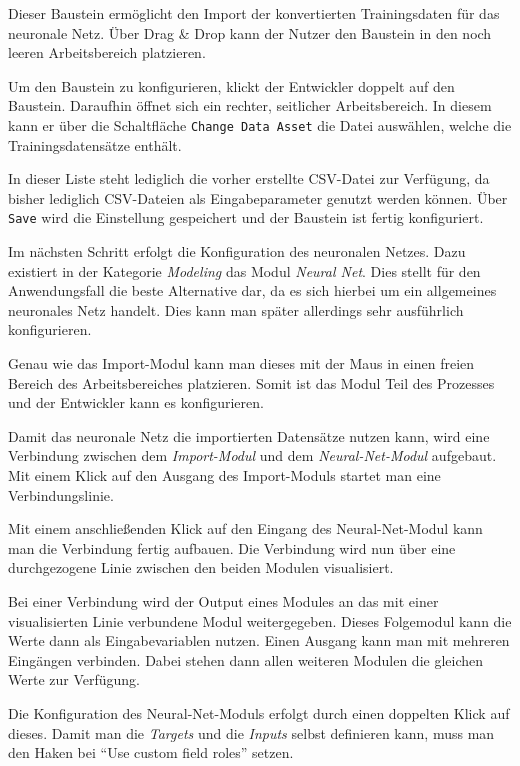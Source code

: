 Dieser Baustein ermöglicht den Import der konvertierten Trainingsdaten für das neuronale Netz. Über Drag \& Drop kann
der Nutzer den Baustein in den noch leeren Arbeitsbereich platzieren.

Um den Baustein zu konfigurieren, klickt der Entwickler doppelt auf den Baustein. Daraufhin öffnet sich ein rechter,
seitlicher Arbeitsbereich. In diesem kann er über die Schaltfläche \texttt{Change Data Asset} die Datei auswählen,
welche die Trainingsdatensätze enthält.

In dieser Liste steht lediglich die vorher erstellte CSV-Datei zur Verfügung, da bisher lediglich CSV-Dateien als
Eingabeparameter genutzt werden können. Über \texttt{Save} wird die Einstellung gespeichert und der Baustein ist fertig
konfiguriert.

Im nächsten Schritt erfolgt die Konfiguration des neuronalen Netzes. Dazu existiert in der Kategorie \textit{Modeling}
das Modul \textit{Neural Net}. Dies stellt für den Anwendungsfall die beste Alternative dar, da es sich hierbei um ein
allgemeines neuronales Netz handelt. Dies kann man später allerdings sehr ausführlich konfigurieren.

Genau wie das Import-Modul kann man dieses mit der Maus in einen freien Bereich des Arbeitsbereiches platzieren. Somit
ist das Modul Teil des Prozesses und der Entwickler kann es konfigurieren.

Damit das neuronale Netz die importierten Datensätze nutzen kann, wird eine Verbindung zwischen dem
\textit{Import-Modul} und dem \textit{Neural-Net-Modul} aufgebaut. Mit einem Klick auf den Ausgang des Import-Moduls
startet man eine Verbindungslinie.

Mit einem anschließenden Klick auf den Eingang des Neural-Net-Modul kann man die Verbindung fertig aufbauen. Die
Verbindung wird nun über eine durchgezogene Linie zwischen den beiden Modulen visualisiert.

Bei einer Verbindung wird der Output eines Modules an das mit einer visualisierten Linie verbundene Modul
weitergegeben. Dieses Folgemodul kann die Werte dann als Eingabevariablen nutzen. Einen Ausgang kann man mit mehreren
Eingängen verbinden. Dabei stehen dann allen weiteren Modulen die gleichen Werte zur Verfügung.

Die Konfiguration des Neural-Net-Moduls erfolgt durch einen doppelten Klick auf dieses. Damit man die
\textit{Targets} und die \textit{Inputs} selbst definieren kann, muss man den Haken bei
\enquote{Use custom field roles} setzen.

